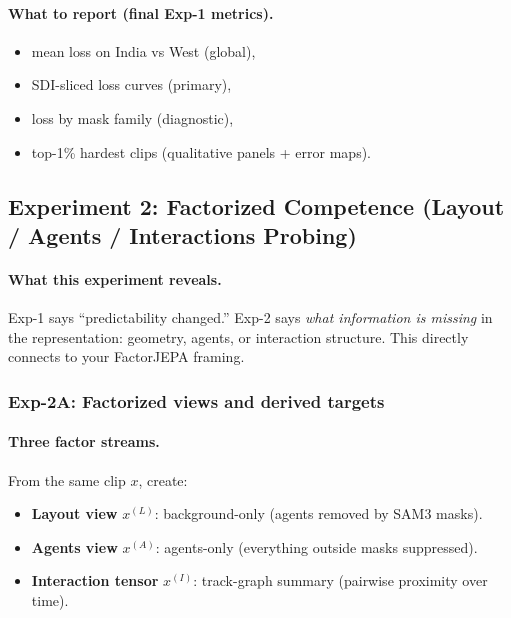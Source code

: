 \paragraph{What to report (final Exp-1 metrics).}
\begin{itemize}[leftmargin=*,itemsep=2pt]
  \item mean loss on India vs West (global),
  \item SDI-sliced loss curves (primary),
  \item loss by mask family (diagnostic),
  \item top-1\% hardest clips (qualitative panels + error maps).
\end{itemize}

\subsection{Experiment 2: Factorized Competence (Layout / Agents / Interactions Probing)}
\label{sec:exp2}

\paragraph{What this experiment reveals.}
Exp-1 says “predictability changed.” Exp-2 says \emph{what information is missing} in the representation: geometry, agents, or interaction structure. This directly connects to your FactorJEPA framing.

\subsubsection{Exp-2A: Factorized views and derived targets}

\paragraph{Three factor streams.}
From the same clip $x$, create:
\begin{itemize}[leftmargin=*,itemsep=2pt]
  \item \textbf{Layout view} $x^{(L)}$: background-only (agents removed by SAM3 masks).
  \item \textbf{Agents view} $x^{(A)}$: agents-only (everything outside masks suppressed).
  \item \textbf{Interaction tensor} $x^{(I)}$: track-graph summary (pairwise proximity over time).
\end{itemize}

